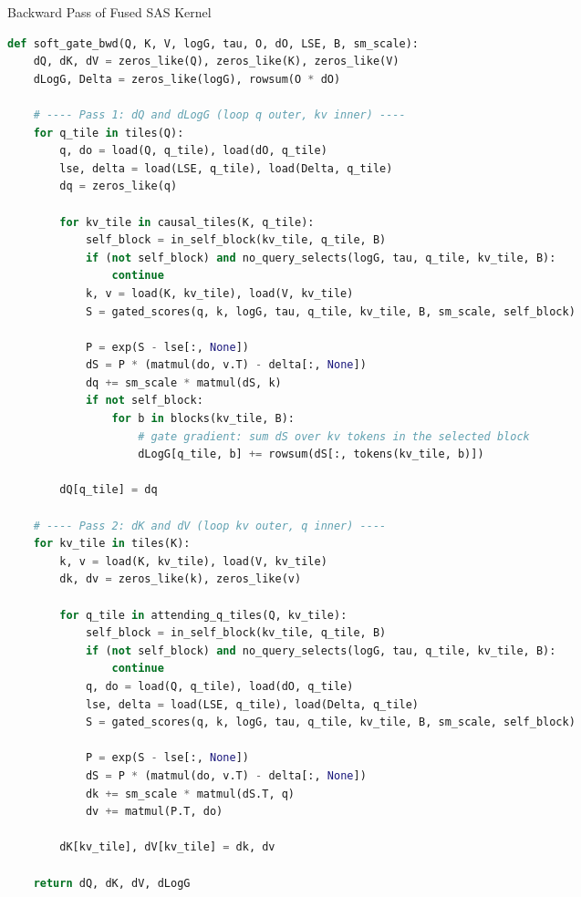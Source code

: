 \begin{algorithm}
\caption{Backward Pass of Fused SAS Kernel}
\label{alg:soft_gate_bwd}
\begin{lstlisting}[language=python]
def soft_gate_bwd(Q, K, V, logG, tau, O, dO, LSE, B, sm_scale):
    dQ, dK, dV = zeros_like(Q), zeros_like(K), zeros_like(V)
    dLogG, Delta = zeros_like(logG), rowsum(O * dO)

    # ---- Pass 1: dQ and dLogG (loop q outer, kv inner) ----
    for q_tile in tiles(Q):
        q, do = load(Q, q_tile), load(dO, q_tile)
        lse, delta = load(LSE, q_tile), load(Delta, q_tile)
        dq = zeros_like(q)

        for kv_tile in causal_tiles(K, q_tile):
            self_block = in_self_block(kv_tile, q_tile, B)
            if (not self_block) and no_query_selects(logG, tau, q_tile, kv_tile, B):
                continue
            k, v = load(K, kv_tile), load(V, kv_tile)
            S = gated_scores(q, k, logG, tau, q_tile, kv_tile, B, sm_scale, self_block)

            P = exp(S - lse[:, None])
            dS = P * (matmul(do, v.T) - delta[:, None])
            dq += sm_scale * matmul(dS, k)
            if not self_block:
                for b in blocks(kv_tile, B):
                    # gate gradient: sum dS over kv tokens in the selected block
                    dLogG[q_tile, b] += rowsum(dS[:, tokens(kv_tile, b)])

        dQ[q_tile] = dq

    # ---- Pass 2: dK and dV (loop kv outer, q inner) ----
    for kv_tile in tiles(K):
        k, v = load(K, kv_tile), load(V, kv_tile)
        dk, dv = zeros_like(k), zeros_like(v)

        for q_tile in attending_q_tiles(Q, kv_tile):
            self_block = in_self_block(kv_tile, q_tile, B)
            if (not self_block) and no_query_selects(logG, tau, q_tile, kv_tile, B):
                continue
            q, do = load(Q, q_tile), load(dO, q_tile)
            lse, delta = load(LSE, q_tile), load(Delta, q_tile)
            S = gated_scores(q, k, logG, tau, q_tile, kv_tile, B, sm_scale, self_block)

            P = exp(S - lse[:, None])
            dS = P * (matmul(do, v.T) - delta[:, None])
            dk += sm_scale * matmul(dS.T, q)
            dv += matmul(P.T, do)

        dK[kv_tile], dV[kv_tile] = dk, dv

    return dQ, dK, dV, dLogG
\end{lstlisting}
\end{algorithm}


